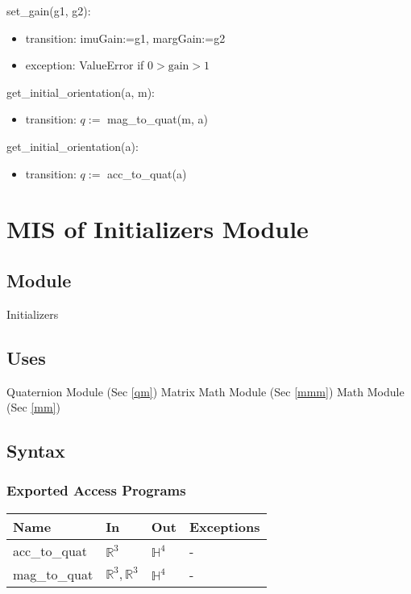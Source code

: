 \documentclass[12pt, titlepage]{article}
\begin{document}
\noindent set\_gain(g1, g2):
\begin{itemize}
\item transition: imuGain:=g1, margGain:=g2
\item exception: ValueError if $0 > \text{gain} > 1$
\end{itemize}

\noindent get\_initial\_orientation(a, m):
\begin{itemize}
\item transition: $q:=$ mag\_to\_quat(m, a)
\end{itemize}

\noindent get\_initial\_orientation(a):
\begin{itemize}
\item transition: $q:=$ acc\_to\_quat(a)
\end{itemize}

\newpage

\section{MIS of Initializers Module} \label{im}

\subsection{Module}
Initializers

\subsection{Uses}
Quaternion Module (Sec \ref{qm})\newline
Matrix Math Module (Sec \ref{mmm}) \newline
Math Module (Sec \ref{mm})

\subsection{Syntax}

\subsubsection{Exported Access Programs}

\begin{center}
\begin{tabular}{p{3cm} p{3cm} p{3cm} p{3cm}}
\hline
\textbf{Name} & \textbf{In} & \textbf{Out} & \textbf{Exceptions} \\
\hline
acc\_to\_quat & $\mathbb{R}^3$ & $\mathbb{H}^4$ & - \\
mag\_to\_quat & $\mathbb{R}^3, \mathbb{R}^3$ & $\mathbb{H}^4$ & - \\
\hline
\end{tabular}
\end{center}
\end{document}
